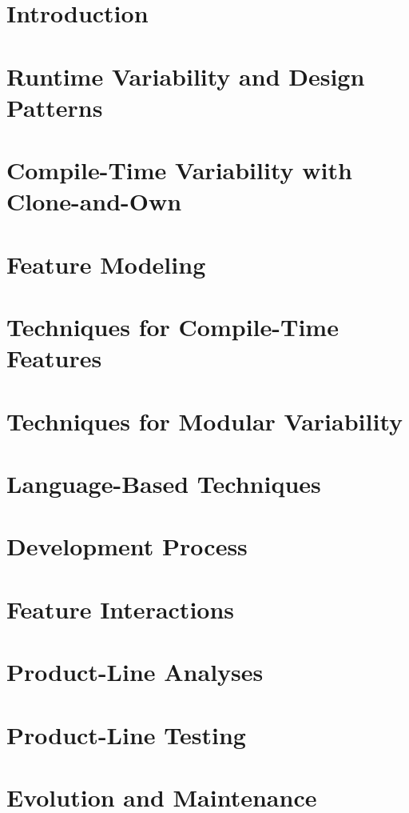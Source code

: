 \documentclass[
	aspectratio=169, %
	8pt, %
	handout, %
]{beamer}
\subtitle{Lecture Topics}
\author{Thomas Thüm, Timo Kehrer, Elias Kuiter, Sebastian Krieter}
\newcommand{\addlecture}[2]{\section{#2}\begin{frame}\end{frame}}
\begin{document}
	

\usebackgroundtemplate{}
\AtBeginSection[]{}


\addlecture{introduction}{Introduction}                               %
\addlecture{runtime}{Runtime Variability and Design Patterns}         %
\addlecture{cloneandown}{Compile-Time Variability with Clone-and-Own} %
\sectionend

\addlecture{modeling}{Feature Modeling}                      %
\addlecture{embedded}{Techniques for Compile-Time Features}  %
\addlecture{apps}{Techniques for Modular Variability}        %
\addlecture{languages}{Language-Based Techniques}            %
\addlecture{process}{Development Process}                    %
\sectionend

\addlecture{interactions}{Feature Interactions}  %
\addlecture{analyses}{Product-Line Analyses}     %
\addlecture{testing}{Product-Line Testing}       %
\addlecture{evonance}{Evolution and Maintenance} %
\end{document}
